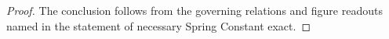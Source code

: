 \begin{proof}
  The conclusion follows from the governing relations and figure readouts named in the statement of necessary Spring Constant exact.
\end{proof}
